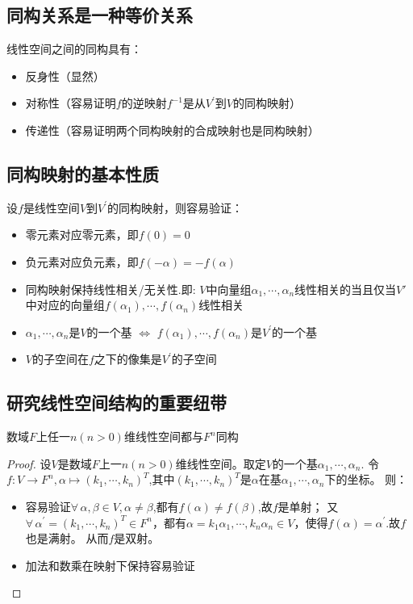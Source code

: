 \subsection*{同构关系是一种等价关系}
线性空间之间的同构具有：
\begin{itemize}
    \item 反身性（显然）
    \item 对称性（容易证明$f$的逆映射$f^{-1}$是从$V^{'}$到$V$的同构映射）
    \item 传递性（容易证明两个同构映射的合成映射也是同构映射）
\end{itemize}

\subsection*{同构映射的基本性质}
\begin{property}
    设$f$是线性空间$V$到$V^{'}$的同构映射，则容易验证：
    \begin{itemize}
        \item 零元素对应零元素，即$f(0) = 0$
        \item 负元素对应负元素，即$f(-\alpha) = -f(\alpha)$
        \item 同构映射保持线性相关/无关性.即:
        $V$中向量组$\alpha_1, \cdots, \alpha_n$线性相关的当且仅当$V'$中对应的向量组$f(\alpha_1), \cdots, f(\alpha_n)$线性相关
        \item $\alpha_1, \cdots, \alpha_n$是$V$的一个基 $\Leftrightarrow$ $f(\alpha_1), \cdots, f(\alpha_n)$是$V^{'}$的一个基
        \item $V$的子空间在$f$之下的像集是$V^{'}$的子空间
    \end{itemize}
\end{property}

\subsection*{研究线性空间结构的重要纽带}
\begin{theorem}
    数域$F$上任一$n(n > 0)$维线性空间都与$F^n$同构
\end{theorem}

\begin{proof}
    设$V$是数域$F$上一$n(n > 0)$维线性空间。取定$V$的一个基$\alpha_1, \cdots, \alpha_n$.
    令$f:V \to F^n, \alpha \mapsto (k_1, \cdots, k_n)^T$,其中$(k_1, \cdots, k_n)^T$是$\alpha$在基$\alpha_1, \cdots, \alpha_n$下的坐标。
    则：
    \begin{itemize}
        \item 容易验证$\forall \, \alpha, \beta \in V, \alpha \neq \beta$,都有$f(\alpha) \neq f(\beta)$,故$f$是单射；
        又$\forall \, \alpha^{'} = (k_1, \cdots, k_n)^T \in F^n$，都有$\alpha = k_1\alpha_1, \cdots, k_n\alpha_n \in V$，使得$f(\alpha) = \alpha^{'}$.故$f$也是满射。
        从而$f$是双射。
        \item 加法和数乘在映射下保持容易验证
    \end{itemize}
\end{proof}

